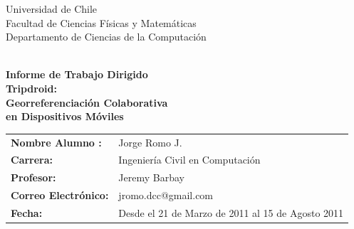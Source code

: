 \documentclass[10pt,letterpaper]{article}
\begin{document}
\begin{titlepage}
\begin{minipage}{12cm} Universidad de Chile
\\ Facultad de Ciencias F\'isicas y Matem\'aticas
\\ Departamento de Ciencias de la Computaci\'on\\
\\
\end{minipage}
\vspace*{2cm}
\begin{center}
\vspace{0.2cm}
{\Large \bf\vspace{0.5cm} Informe de Trabajo Dirigido}\\
{\Huge\bf\vspace{0.3cm} Tripdroid:}\\
{\Huge\bf\vspace{0.3cm} Georreferenciación Colaborativa}\\
{\Huge\bf\vspace{0.2cm} en Dispositivos Móviles}\\

\end{center}
\vspace{4cm}
\begin{tabular}{ll}
\bf{Nombre Alumno :}& Jorge Romo J. \\
\bf{Carrera:} & Ingeniería Civil en Computación\\ 
\bf{Profesor:} & Jeremy Barbay  \\ 
\bf{Correo Electrónico:} & jromo.dcc@gmail.com  \\ 
\bf{Fecha:} & Desde el 21 de Marzo de 2011 al 15 de Agosto 2011  \\ 
\end{tabular}
\end{titlepage}
\end{document}
